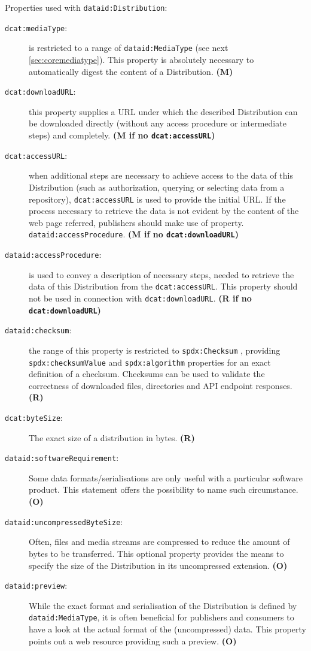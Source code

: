 \documentclass[a4paper,english,twoside,BCOR1.5cm,headsepline,DIV12,appendixprefix,final,12pt]{scrbook}
\newcommand{\prop}[1]{{{\texttt{#1}}}}
\begin{document}
Properties used with \prop{dataid:Distribution}:
\begin{description}
\item[\prop{dcat:mediaType}:] is restricted to a range of \prop{dataid:MediaType} (see next \cref{sec:coremediatype}). This property is absolutely necessary to automatically digest the content of a Distribution. \textbf{(M)}
\item[\prop{dcat:downloadURL}:] this property supplies a URL under which the described Distribution can be downloaded directly (without any access procedure or intermediate steps) and completely. \textbf{(M if no \prop{dcat:accessURL})}
\item[\prop{dcat:accessURL}:] when additional steps are necessary to achieve access to the data of this Distribution (such as authorization, querying or selecting data from a repository), \prop{dcat:accessURL} is used to provide the initial URL. If the process necessary to retrieve the data is not evident by the content of the web page referred, publishers should make use of property. \prop{dataid:accessProcedure}. \textbf{(M if no \prop{dcat:downloadURL})}
\item[\prop{dataid:accessProcedure}:] is used to convey a description of necessary steps, needed to retrieve the data of this Distribution from the \prop{dcat:accessURL}. This property should not be used in connection with \prop{dcat:downloadURL}. \textbf{(R if no \prop{dcat:downloadURL})}
\item[\prop{dataid:checksum}:] the range of this property is restricted to \prop{spdx:Checksum} \cite{spdx}, providing \prop{spdx:checksumValue} and \prop{spdx:algorithm} properties for an exact definition of a checksum. Checksums can be used to validate the correctness of downloaded files, directories and API endpoint responses. \textbf{(R)}
\item[\prop{dcat:byteSize}:] The exact size of a distribution in bytes. \textbf{(R)}
\item[\prop{dataid:softwareRequirement}:] Some data formats/serialisations are only useful with a particular software product. This statement offers the possibility to name such circumstance. \textbf{(O)}
\item[\prop{dataid:uncompressedByteSize}:] Often, files and media streams are compressed to reduce the amount of bytes to be transferred. This optional property provides the means to specify the size of the Distribution in its uncompressed extension. \textbf{(O)}
\item[\prop{dataid:preview}:] While the exact format and serialisation of the Distribution is defined by \prop{dataid:MediaType}, it is often beneficial for publishers and consumers to have a look at the actual format of the (uncompressed) data. This property points out a web resource providing such a preview. \textbf{(O)}

\end{description}
\end{document}
